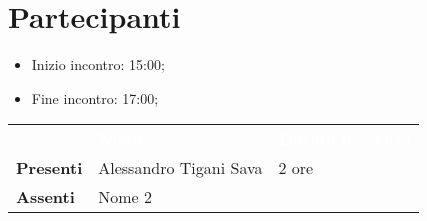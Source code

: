 \section{Partecipanti}

\begin{itemize}
    \item Inizio incontro: 15:00;
    \item Fine incontro: 17:00;
\end{itemize}


\begin{center}
	{\renewcommand{\arraystretch}{1.5}
	\begin{tabular}{lll}
		\rowcolor[RGB]{125, 1, 158}
							& \textcolor{white}{\textbf{Nome}}  & \textcolor{white}{\textbf{Durata presenza}} \\
		\rowcolor[RGB]{207, 159, 255}
		\textbf{Presenti}   & Alessandro Tigani Sava 	& 2 ore     \\
		\rowcolor[RGB]{234, 213, 255}
		\textbf{Assenti}	& Nome 2            &      		\\
	\end{tabular}	
	}
	\end{center}
